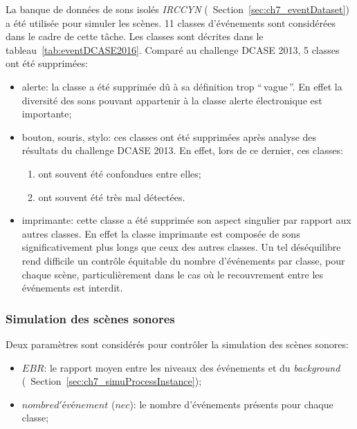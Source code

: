 La banque de données de sons isolés \emph{IRCCYN} (\cf~Section~\ref{sec:ch7_eventDataset}) a été utilisée pour simuler les scènes. 11 classes d'événements sont considérées dans le cadre de cette tâche. Les classes sont décrites dans le tableau~\ref{tab:eventDCASE2016}. Comparé au challenge DCASE 2013, 5 classes ont été supprimées:

\begin{itemize}
\item alerte: la classe a été supprimée dû à sa définition trop ``\,vague\,''. En effet la diversité des sons pouvant appartenir à la classe alerte électronique est importante;

\item bouton, souris, stylo: ces classes ont été supprimées après analyse des résultats du challenge DCASE 2013. En effet, lors de ce dernier, ces classes:

\begin{enumerate}
\item ont souvent été confondues entre elles;
\item ont souvent été très mal détectées. 
\end{enumerate}

\item imprimante: cette classe a été supprimée   son aspect singulier par rapport aux autres classes. En effet la classe imprimante est composée de sons significativement plus longs que ceux des autres classes. Un tel déséquilibre rend difficile un contrôle équitable du nombre d'événements par classe, pour chaque scène, particulièrement dans le cas où le recouvrement entre les événements est interdit.

\end{itemize}

\subsubsection{Simulation des scènes sonores}
\label{sec:ch7_simulationDcase2016}

Deux paramètres sont considérés pour contrôler la simulation des scènes sonores:

\begin{itemize}
\item $EBR$: le rapport moyen entre les niveaux des événements et du \emph{background} (\cf~Section~\ref{sec:ch7_simuProcessInstance});
\item $nombre d'événement$ ($nec$): le nombre d'événements présents pour chaque classe;
\end{itemize}

